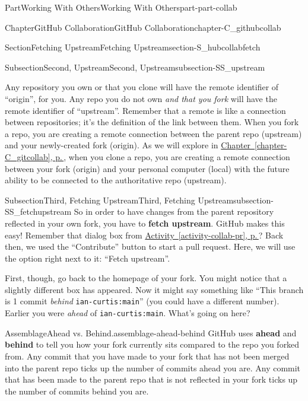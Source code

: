 \documentclass[twoside,10pt,]{book}
\newcommand{\xreffont}{\relax}
\newcommand{\mono}[1]{\texttt{#1}}
\newcommand{\terminology}[1]{\textbf{#1}}
\begin{document}
\begin{partptx}{Part}{Working With Others}{}{Working With Others}{}{}{part-part-collab}
\begin{chapterptx}{Chapter}{GitHub Collaboration}{}{GitHub Collaboration}{}{}{chapter-C_githubcollab}
\begin{sectionptx}{Section}{Fetching Upstream}{}{Fetching Upstream}{}{}{section-S_hubcollabfetch}
\begin{subsectionptx}{Subsection}{Second, Upstream}{}{Second, Upstream}{}{}{subsection-SS_upstream}
\par
Any repository you own or that you clone will have the remote identifier of ``origin'', for you. Any repo you do not own \emph{and that you fork} will have the remote identifier of ``upstream''. Remember that a remote is like a connection between repositories; it's the definition of the link between them. When you fork a repo, you are creating a remote connection between the parent repo (upstream) and your newly-created fork (origin). As we will explore in \hyperref[chapter-C_gitcollab]{Chapter~{\xreffont\ref{chapter-C_gitcollab}}, p.\,\pageref{chapter-C_gitcollab}}, when you clone a repo, you are creating a remote connection between your fork (origin) and your personal computer (local) with the future ability to be connected to the authoritative repo (upstream).%
\end{subsectionptx}
%
%
\typeout{************************************************}
\typeout{************************************************}
%
\begin{subsectionptx}{Subsection}{Third, Fetching Upstream}{}{Third, Fetching Upstream}{}{}{subsection-SS_fetchupstream}
%
%
So in order to have changes from the parent repository reflected in your own fork, you have to \terminology{fetch upstream}. GitHub makes this easy! Remember that dialog box from \hyperref[activity-collab-pr]{Activity~{\xreffont\ref{activity-collab-pr}}, p.\,\pageref{activity-collab-pr}}? Back then, we used the ``Contribute'' button to start a pull request. Here, we will use the option right next to it: ``Fetch upstream''.%
\par
First, though, go back to the homepage of your fork. You might notice that a slightly different box has appeared. Now it might say something like ``This branch is 1 commit \emph{behind} \mono{ian-curtis:main}'' (you could have a different number). Earlier you were \emph{ahead} of \mono{ian-curtis:main}. What's going on here?%
\begin{assemblage}{Assemblage}{Ahead vs. Behind.}{assemblage-ahead-behind}%
GitHub uses \terminology{ahead} and \terminology{behind} to tell you how your fork currently sits compared to the repo you forked from. Any commit that you have made to your fork that has not been merged into the parent repo ticks up the number of commits ahead you are. Any commit that has been made to the parent repo that is not reflected in your fork ticks up the number of commits behind you are.%
\par

\end{assemblage}
\end{subsectionptx}
\end{sectionptx}
\end{chapterptx}
\end{partptx}
\end{document}
